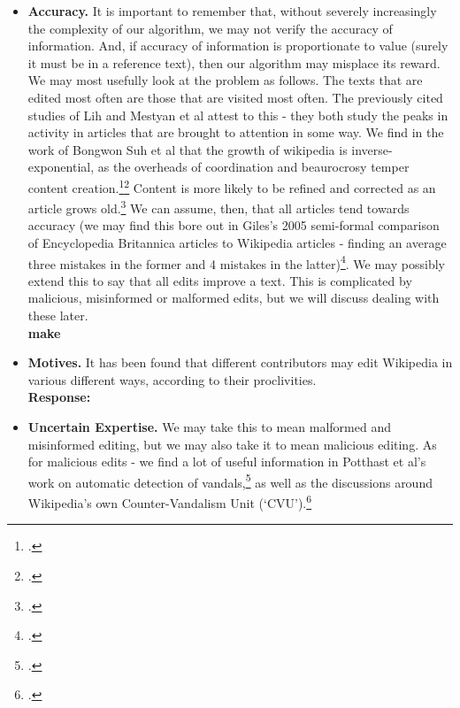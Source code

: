 \documentclass[a4paper,11pt,twoside,notitlepage]{article}
\renewcommand{\cite}[1]{\footcite{#1}}
\begin{document}
        \begin{itemize}
          \item \textbf{Accuracy.} It is important to remember that,
            without severely increasingly the complexity of our
            algorithm, we may not verify the accuracy of
            information. And, if accuracy of information is
            proportionate to value (surely it must be in a reference
            text), then our algorithm may misplace its reward. We may
            most usefully look at the problem as follows. The texts that
            are edited most often are those that are visited most
            often. The previously cited studies of Lih and Mestyan et al
            attest to this - they both study the peaks in activity in
            articles that are brought to attention in some way. We
            find in the work of Bongwon Suh et al that the growth of
            wikipedia is inverse-exponential, as the overheads of
            coordination and beaurocrosy temper content
            creation.\cite{Suh2009}\cite{Kittur2007} Content is more
            likely to be refined and corrected as an article grows
            old.\cite{Wilkinson2007} We can assume, then, that all
            articles tend towards accuracy (we may find this bore out
            in Giles's 2005 semi-formal comparison of Encyclopedia
            Britannica articles to Wikipedia articles - finding an
            average three mistakes in the former and 4 mistakes in the
            latter)\cite{Giles2005}. We may possibly extend this to
            say that all edits improve a text. This is complicated by
            malicious, misinformed or malformed edits, but we will
            discuss dealing with these later.\\
            \textbf{make}
          \item \textbf{Motives.} It has been found that different
            contributors may edit Wikipedia in various different ways,
            according to their proclivities.\\
            \textbf{Response:}
          \item \textbf{Uncertain Expertise.} We may take this to mean
            malformed and misinformed editing, but we may also take it
            to mean malicious editing. As for malicious edits - we
            find a lot of useful information in Potthast et al's work
            on automatic detection of vandals,\cite{Potthast2008} as
            well as the discussions around Wikipedia's own
            Counter-Vandalism Unit (`CVU').\cite{wiki-vandalism}

\end{itemize}
\end{document}
